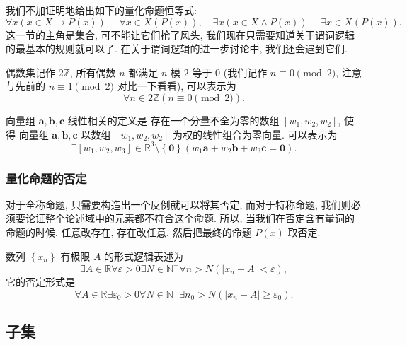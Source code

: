 \documentclass[10pt,UTF8]{book} %
\begin{document}
我们不加证明地给出如下的量化命题恒等式:
\[ \forall x \left( x \in X \to P(x) \right)
\equiv \forall x \in X \left( P(x) \right),
\quad 
\exists x \left( x \in X \wedge P(x) \right)
\equiv \exists x \in X \left( P(x) \right). \]
这一节的主角是集合, 可不能让它们抢了风头, 我们现在只需要知道关于谓词逻辑的最基本的规则就可以了.
在关于谓词逻辑的进一步讨论中, 我们还会遇到它们.

\begin{example}
    偶数集记作 $2\mathbb{Z}$, {\kaishu 所有偶数 $n$ 都满足 $n$ 模 $2$ 等于 $0$}
    (我们记作 $n \equiv 0 \pmod 2$, 注意与先前的 $n \equiv 1 \pmod 2$ 对比一下看看), 
    可以表示为
    \[ \forall n \in 2\mathbb{Z} \left(
        n \equiv 0 \pmod 2
    \right). \]
\end{example}
\begin{example}
    向量组 $\boldsymbol{a}, \boldsymbol{b}, \boldsymbol{c}$ 线性相关的定义是
    存在一个分量不全为零的数组 $[w_1,w_2,w_2]$, 使得
    向量组 $\boldsymbol{a}, \boldsymbol{b}, \boldsymbol{c}$ 以数组 $[w_1,w_2,w_2]$
    为权的线性组合为零向量. 可以表示为
    \[ \exists [w_1,w_2,w_3] \in \mathbb{R}^3\setminus\left\{\boldsymbol{0}\right\}
    \left(
        w_1\boldsymbol{a} + w_2\boldsymbol{b} + w_3\boldsymbol{c} = \boldsymbol{0}
    \right). \]
\end{example}

\subsubsection{量化命题的否定}

对于全称命题, 只需要构造出一个反例就可以将其否定,
而对于特称命题, 我们则必须要论证整个论述域中的元素都不符合这个命题. 所以,
当我们在否定含有量词的命题的时候, {\kaishu 任意改存在, 存在改任意, 然后把最终的命题 $P(x)$ 取否定}.
\begin{example}
    数列 $\left\{ x_n \right\}$ 有极限 $A$ 的形式逻辑表述为
    \[ \exists A \in \mathbb{R} \forall \varepsilon > 0 \exists N \in \mathbb{N}^+ \forall n>N \left(
        |x_n - A| < \varepsilon
    \right), \]
    它的否定形式是
    \[ \forall A \in \mathbb{R} \exists \varepsilon_0 > 0 \forall N \in \mathbb{N}^+ \exists n_0 > N \left(
        |x_n - A| \geqslant \varepsilon_0
    \right). \]
\end{example}

\subsection{子集}
\end{document}
